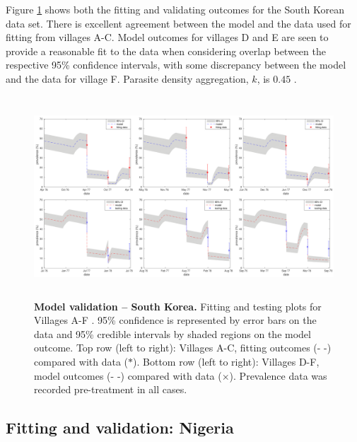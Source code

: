 Figure \ref{Fig3} shows both the fitting and validating outcomes for the South Korean data set. There is excellent agreement between the model and the data used for fitting from villages A-C. Model outcomes for villages D and E are seen to provide a reasonable fit to the data when considering overlap between the respective 95\% confidence intervals, with some discrepancy between the model and the data for village F. Parasite density aggregation, $k$, is $0.45$ \cite{Chai,Guyatt}.

\begin{figure}[!h]
\includegraphics[height=7.5cm]{Project/Figures/STH/Fig3.pdf}
\caption{{\bf Model validation -- South Korea.}
Fitting and testing plots for Villages A-F \cite{Seo}. 95\% confidence is represented by error bars on the data and 95\% credible intervals by shaded regions on the model outcome. Top row (left to right): Villages A-C, fitting outcomes (- -) compared with data ($*$). Bottom row (left to right): Villages D-F, model outcomes (- -) compared with data ($\times$). Prevalence data was recorded pre-treatment in all cases.}
\label{Fig3}
\end{figure} 

\subsection{Fitting and validation: Nigeria}


